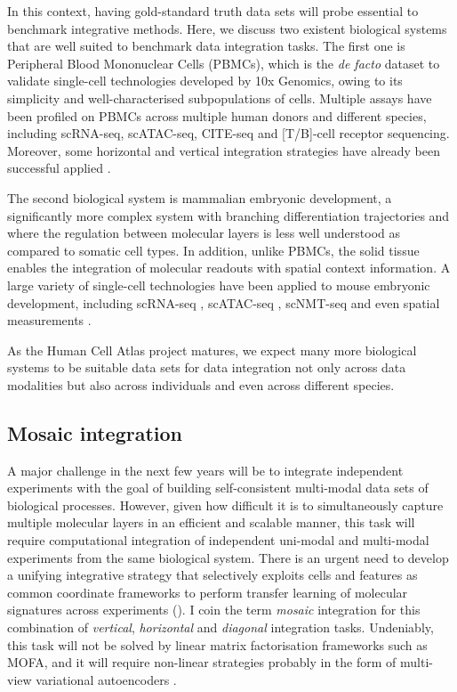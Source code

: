 In this context, having gold-standard truth data sets will probe essential to benchmark integrative methods. Here, we discuss two existent biological systems that are well suited to benchmark data integration tasks. The first one is Peripheral Blood Mononuclear Cells (PBMCs), which is the \textit{de facto} dataset to validate single-cell technologies developed by 10x Genomics, owing to its simplicity and well-characterised subpopulations of cells. Multiple assays have been profiled on PBMCs across multiple human donors and different species, including scRNA-seq, scATAC-seq, CITE-seq and [T/B]-cell receptor sequencing. Moreover, some horizontal and vertical integration strategies have already been successful applied \cite{Stuart2019b}.

The second biological system is mammalian embryonic development, a significantly more complex system with branching differentiation trajectories and where the regulation between molecular layers is less well understood as compared to somatic cell types. In addition, unlike PBMCs, the solid tissue enables the integration of molecular readouts with spatial context information. A large variety of single-cell technologies have been applied to mouse embryonic development, including scRNA-seq \cite{Pijuan-Sala2019,Mohammed2017,Scialdone2016,Grosswendt2020,Nowotschin2019}, scATAC-seq \cite{Pijuan-Sala2020}, scNMT-seq \cite{Argelaguet2019} and even spatial measurements \cite{Peng2019,VanDenBink2020}.

As the Human Cell Atlas project \cite{Aviv2017} matures, we expect many more biological systems to be suitable data sets for data integration not only across data modalities but also across individuals and even across different species.

\subsection{Mosaic integration} 

A major challenge in the next few years will be to integrate independent experiments with the goal of building self-consistent multi-modal data sets of biological processes. However, given how difficult it is to simultaneously capture multiple molecular layers in an efficient and scalable manner, this task will require computational integration of independent uni-modal and multi-modal experiments from the same biological system. There is an urgent need to develop a unifying integrative strategy that selectively exploits cells and features as common coordinate frameworks to perform transfer learning of molecular signatures across experiments (). I coin the term \textit{mosaic} integration for this combination of \textit{vertical}, \textit{horizontal} and \textit{diagonal} integration tasks. Undeniably, this task will not be solved by linear matrix factorisation frameworks such as MOFA, and it will require non-linear strategies probably in the form of multi-view variational autoencoders \cite{Lopez2018}.

